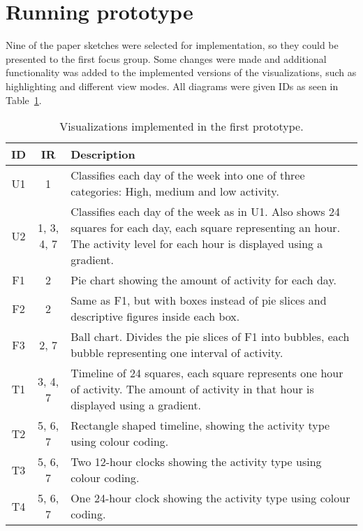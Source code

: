 \section{Running prototype}
\label{sec:runningPrototype1}
Nine of the paper sketches were selected for implementation, so they could be presented to the first focus group. Some changes were made and additional functionality was added to the implemented versions of the visualizations, such as highlighting and different view modes. All diagrams were given IDs as seen in Table~\ref{tab:runProtDesc1}.

\begin{table}[h!]
  \begin{center}
  \begin{tabular}{|c|c|p{10cm}|}
    \hline
    \textbf{ID} & \textbf{IR} & \textbf{Description}\\ \hline
    U1 & 1 & Classifies each day of the week into one of three categories: High, medium and low activity. \\ \hline
    U2 & 1, 3, 4, 7 & Classifies each day of the week as in U1. Also shows 24 squares for each day, each square representing an hour. The activity level for each hour is displayed using a gradient. \\ \hline
    F1 & 2 & Pie chart showing the amount of activity for each day. \\ \hline
    F2 & 2 & Same as F1, but with boxes instead of pie slices and descriptive figures inside each box.  \\ \hline
    F3 & 2, 7 & Ball chart. Divides the pie slices of F1 into bubbles, each bubble representing one interval of activity. \\ \hline
    T1 & 3, 4, 7 & Timeline of 24 squares, each square represents one hour of activity. The amount of activity in that hour is displayed using a gradient. \\ \hline
    T2 & 5, 6, 7 & Rectangle shaped timeline, showing the activity type using colour coding.  \\ \hline
    T3 & 5, 6, 7 & Two 12-hour clocks showing the activity type using colour coding. \\ \hline
    T4 & 5, 6, 7 & One 24-hour clock showing the activity type using colour coding. \\ \hline
  \end{tabular}
  \end{center}
  \caption[Visualizations in the first prototype]{Visualizations implemented in the first prototype.}
  \label{tab:runProtDesc1}
\end{table}

